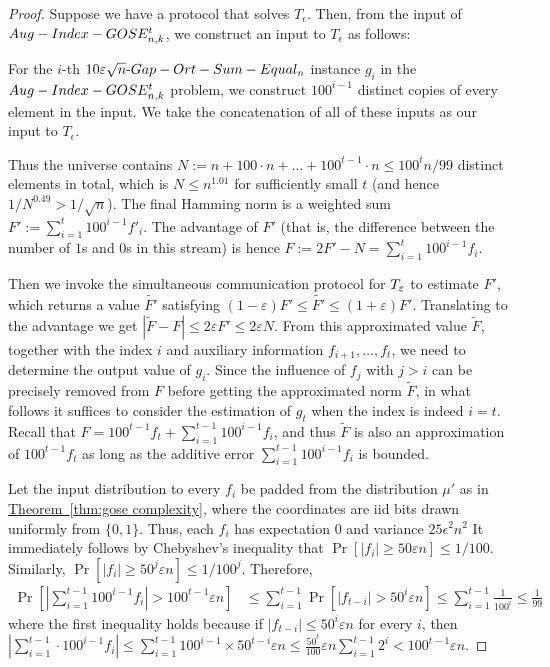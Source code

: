 \documentclass[11pt]{article}
\numberwithin{equation}{section}
\theoremstyle{definition}
\theoremstyle{plain}
\newcommand{\expref}[2]{\hyperref[#2]{#1~\ref{#2}}}
\newcommand{\gap}{\ensuremath{\varepsilon}}
\newcommand{\eqdef}{\ensuremath{:=}}
\newcommand{\hest}{ \textsc{T} }
\newcommand{\gose}{\textsc{Gap-Ort-Sum-Equal}}
\newcommand{\auggo}{\textsc{Aug-Index-GOSE}}
\begin{document}
\begin{proof}

{\color{black}Suppose we have a protocol that solves $T_\epsilon$. Then, from the input of $\auggo_{n,k}^t$, we construct an input to $T_\epsilon$ as follows:

For the $i$-th $10\text{$\gap\sqrt{n}$-$\gose_n$}$ instance $g_i$ in the $\auggo_{n,k}^{t}$ problem, we construct $100^{i-1}$ distinct copies of every element in the input. We take the concatenation of all of these inputs as our input to $T_\epsilon$.}
	Thus the universe contains $N\eqdef n+100\cdot n+\dots+100^{t-1}\cdot n \le 100^t n/99$ distinct elements in total, which is $N\le n^{1.01}$ for sufficiently small $t$ (and hence $1/N^{0.49}>1/\sqrt{n}$).
	The final Hamming norm is a weighted sum $F'\eqdef \sum_{i=1}^t 100^{i-1} f'_i$.
	The advantage of $F'$ {\color{black}(that is, the difference between the number of $1$s and $0$s in this stream)} is hence $F \eqdef 2F'-N = \sum_{i=1}^t 100^{i-1} f_i$. 

	Then we invoke the simultaneous communication protocol for $\hest_\gap$ to estimate $F'$, which returns a value $\widetilde{F'}$ satisfying 
	$(1-\gap)F' \le \widetilde{F'} \le (1+\gap)F'$.
	Translating to the advantage we get $\left| \widetilde{F} -  F \right| \le 2\gap F' \le 2\gap N$.
	From this approximated value $\widetilde{F}$, together with the index $i$ and auxiliary information $f_{i+1},\dots, f_t$, we need to determine the output value of $g_i$.
	Since the influence of $f_{j}$ with $j>i$ can be precisely removed from $F$ before getting the approximated norm $\widetilde{F}$, in what follows it suffices to consider the estimation of $g_t$ when the index is indeed $i=t$.
	Recall that $F = 100^{t-1} f_t + \sum_{i=1}^{t-1} 100^{i-1} f_i$,
	and thus $\widetilde{F}$ is also an approximation of $100^{t-1} f_t$ as long as the additive error $\sum_{i=1}^{t-1} 100^{i-1} f_i$ is bounded.

	Let the input distribution to every $f_i$ be padded from the \text{$1$-$\gose_{\epsilon^{-2}}$} distribution $\mu'$ as in \expref{Theorem}{thm:gose complexity}, where the coordinates are iid bits drawn uniformly from $\{0,1\}$. Thus, each $f_i$ has expectation $0$ and variance $25\epsilon^2n^2$
	It immediately follows by Chebyshev's inequality that $\Pr\left[|f_i|\ge 50 \gap n\right] \le 1/100$.
	Similarly, $\Pr\left[|f_{i}|\ge 50^j \gap n\right] \le 1/100^j$.
	Therefore,
	\begin{align}
		\Pr\left[ \left|\sum_{i=1}^{t-1} 100^{i-1} f_i \right|>  100^{t-1}\gap n\right] 
		& \le \sum_{i=1}^{t-1} \Pr\left[ \left|f_{t-i}\right| >  50^i \gap n \right]
		\le \sum_{i=1}^{t-1} \frac{1}{100^i} \le \frac{1}{99}
	\end{align}
	where the first inequality holds because if $\left|f_{t-i}\right| \le 50^i \gap n $ for every $i$, then $ \left|\sum_{i=1}^{t-1} \cdot 100^{i-1} f_i \right|\le \sum_{i=1}^{t-1} 100^{i-1}\times 50^{t-i} \gap n\le \frac{50^t}{100}\gap n\sum_{i=1}^{t-1} 2^i < 100^{t-1}\gap n$.


\end{proof}
\end{document}
